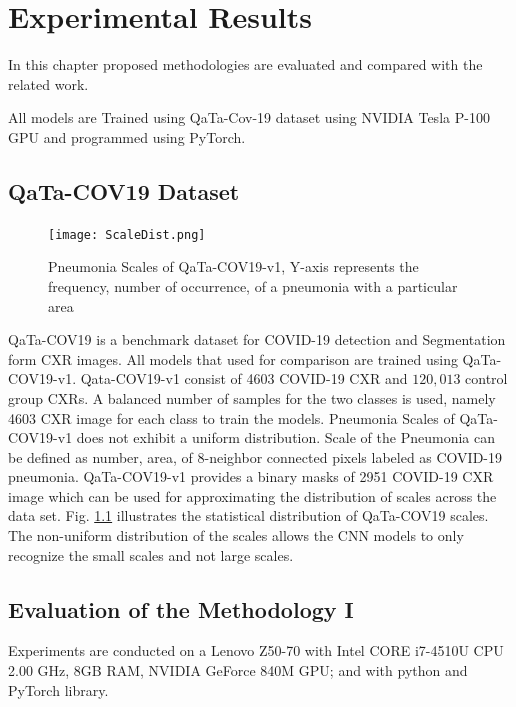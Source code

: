 
\chapter{Experimental Results} %

\label{chp:results} %
In this chapter proposed methodologies are evaluated and compared with the related work.

All models are Trained using QaTa-Cov-19 \cite{ahishali2021advance} dataset using NVIDIA Tesla P-100 GPU and programmed using PyTorch.
\section{QaTa-COV19 Dataset}
\begin{center}
\begin{figure}[htbp]
\centerline{\texttt{[image: ScaleDist.png]}}
\caption{Pneumonia Scales of QaTa-COV19-v1, Y-axis represents the frequency, number of occurrence, of a pneumonia with a particular area}
\label{pdist}
\end{figure}
\end{center}
QaTa-COV19 is a benchmark dataset for COVID-19 detection and Segmentation form CXR images. All models that used for comparison are trained using QaTa-COV19-v1. Qata-COV19-v1 consist of 4603 COVID-19 CXR and $120,013$ control group CXRs. A balanced number of samples for the two classes is used, namely 4603 CXR image for each class to train the models. Pneumonia Scales of QaTa-COV19-v1 does not exhibit a uniform distribution. Scale of the Pneumonia can be defined as number, area, of 8-neighbor connected pixels labeled as COVID-19 pneumonia. QaTa-COV19-v1 provides a binary masks of 2951 COVID-19 CXR image which can be used for approximating the distribution of scales across the data set. Fig. \ref{pdist} illustrates the statistical distribution of QaTa-COV19 scales. The non-uniform distribution of the scales allows the CNN models to only recognize the small scales and not large scales.

\section{Evaluation of the Methodology I}

Experiments are conducted on a Lenovo Z50-70 with Intel CORE i7-4510U CPU 2.00 GHz, 8GB RAM, NVIDIA GeForce 840M GPU; and with python and PyTorch library.

